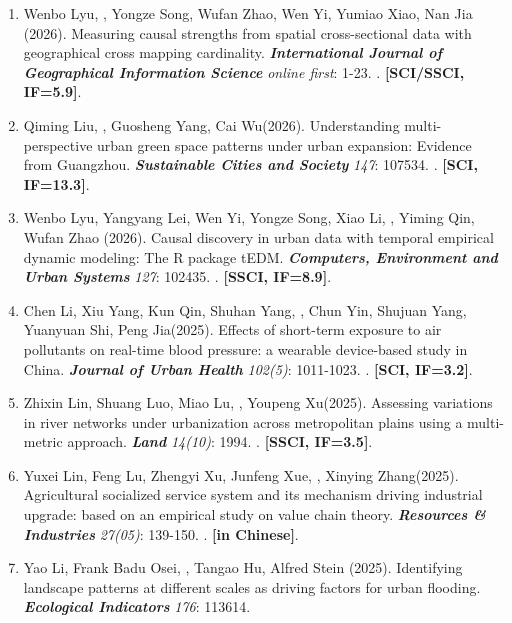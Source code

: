 \begin{enumerate}
\item
    Wenbo Lyu, \Shaoqing, Yongze Song\CS, Wufan Zhao, Wen Yi, Yumiao Xiao, Nan Jia (2026).
    Measuring causal strengths from spatial cross-sectional data with geographical cross mapping cardinality.
    \textbf{\textit{International Journal of Geographical Information Science}} \textit{online first}: 1-23.
    . \textbf{[SCI/SSCI, IF=5.9]}.
\item
    Qiming Liu, \Shaoqing, Guosheng Yang, Cai Wu\CS (2026).
    Understanding multi-perspective urban green space patterns under urban expansion: Evidence from Guangzhou.
    \textbf{\textit{Sustainable Cities and Society}} \textit{147}: 107534.
    . \textbf{[SCI, IF=13.3]}.
\item
    Wenbo Lyu, Yangyang Lei, Wen Yi, Yongze Song, Xiao Li, \Shaoqing, Yiming Qin, Wufan Zhao (2026).
    Causal discovery in urban data with temporal empirical dynamic modeling: The R package tEDM.
    \textbf{\textit{Computers, Environment and Urban Systems}} \textit{127}: 102435.
    . \textbf{[SSCI, IF=8.9]}.
\item
    Chen Li, Xiu Yang, Kun Qin, Shuhan Yang, \Shaoqing, Chun Yin, Shujuan Yang, Yuanyuan Shi\CS, Peng Jia\CS (2025).
    Effects of short-term exposure to air pollutants on real-time blood pressure: a wearable device-based study in China.
    \textbf{\textit{Journal of Urban Health}} \textit{102(5)}: 1011-1023.
    . \textbf{[SCI, IF=3.2]}.
\item
    Zhixin Lin, Shuang Luo, Miao Lu, \Shaoqing, Youpeng Xu\CS (2025).
    Assessing variations in river networks under urbanization across metropolitan plains using a multi-metric approach.
    \textbf{\textit{Land}} \textit{14(10)}: 1994.
    . \textbf{[SSCI, IF=3.5]}.
\item
    Yuxei Lin, Feng Lu, Zhengyi Xu, Junfeng Xue, \Shaoqing, Xinying Zhang\CS (2025).
    Agricultural socialized service system and its mechanism driving industrial upgrade: based on an empirical study on value chain theory.
    \textbf{\textit{Resources \& Industries}} \textit{27(05)}: 139-150.
    . \textbf{[in Chinese]}.
\item
    Yao Li\CS, Frank Badu Osei, \Shaoqing, Tangao Hu, Alfred Stein (2025).
    Identifying landscape patterns at different scales as driving factors for urban flooding.
    \textbf{\textit{Ecological Indicators}} \textit{176}: 113614.

\end{enumerate}
